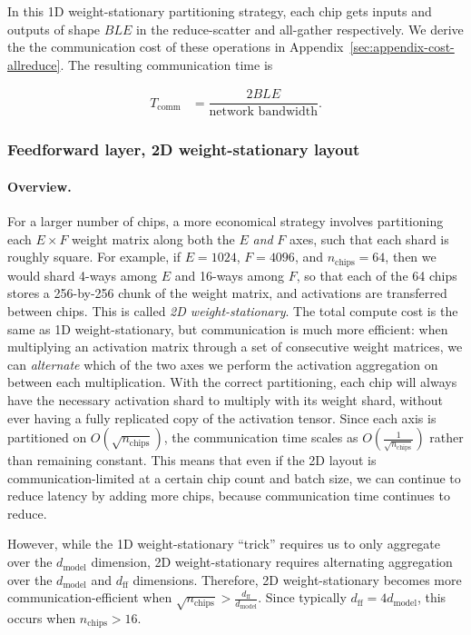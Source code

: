 In this 1D weight-stationary partitioning strategy, each chip gets inputs and outputs of shape $BLE$ in the reduce-scatter and all-gather respectively. We derive the the communication cost of these operations in Appendix~\ref{sec:appendix-cost-allreduce}. The resulting communication time is

\begin{align*}
    T_\textrm{comm} &= \dfrac{2BLE}{ \textrm{network bandwidth} }.
\end{align*}

\subsubsection{Feedforward layer, 2D weight-stationary layout}
\label{sec:weight-stationary}

\paragraph{Overview.} For a larger number of chips, a more economical strategy involves partitioning each $E \times F$ weight matrix along both the $E$ \textit{and} $F$ axes, such that each shard is roughly square. For example, if $E = 1024$, $F = 4096$, and $n_{\textrm{chips}} = 64$, then we would shard 4-ways among $E$ and 16-ways among $F$, so that each of the 64 chips stores a 256-by-256 chunk of the weight matrix, and activations are transferred between chips. This is called \textit{2D weight-stationary}. The total compute cost is the same as 1D weight-stationary, but communication is much more efficient: when multiplying an activation matrix through a set of consecutive weight matrices, we can \textit{alternate} which of the two axes we perform the activation aggregation on between each multiplication. With the correct partitioning, each chip will always have the necessary activation shard to multiply with its weight shard, without ever having a fully replicated copy of the activation tensor. Since each axis is partitioned on $O(\sqrt{n_{\textrm{chips}}})$, the communication time scales as $O(\frac{1}{\sqrt{n_{\textrm{chips}}}})$ rather than remaining constant. This means that even if the 2D layout is communication-limited at a certain chip count and batch size, we can continue to reduce latency by adding more chips, because communication time continues to reduce.

However, while the 1D weight-stationary ``trick'' requires us to only aggregate over the $d_{\textrm{model}}$ dimension, 2D weight-stationary requires alternating aggregation over the $d_{\textrm{model}}$ and $d_{\textrm{ff}}$ dimensions. Therefore, 2D weight-stationary becomes more communication-efficient when $\sqrt{n_{\textrm{chips}}} > \frac{d_{\textrm{ff}}}{d_{\textrm{model}}}$. Since typically $d_{\textrm{ff}} = 4d_{\textrm{model}}$, this occurs when $n_{\textrm{chips}} > 16$. 

